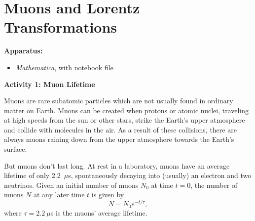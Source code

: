 \section{Muons and Lorentz Transformations}


\makelabheader %

\bigskip
\textbf{Apparatus:}
\begin{itemize}[nosep]
\item \textit{Mathematica}, with notebook file 
\end{itemize}


\bigskip
\textbf{Activity 1: Muon Lifetime} 


Muons are rare subatomic particles which are not usually found in ordinary matter on Earth.  Muons can be created when protons or atomic nuclei, traveling at high speeds from the sun or other stars, strike the Earth's upper atmosphere and collide with molecules in the air.  As a result of these collisions, there are always muons raining down from the upper atmosphere towards the Earth's surface.

But muons don't last long.  At rest in a laboratory, muons have an average lifetime of only 2.2~$\mu$s, spontaneously decaying into (usually) an electron and two neutrinos.  Given an initial number of muons $N_0$ at time $t=0$, the number of muons $N$ at any later time $t$ is given by
\begin{equation}
N=N_0 e^{-t/\tau},
\end{equation}
where $\tau = 2.2~\mu$s is the muons' average lifetime.  


